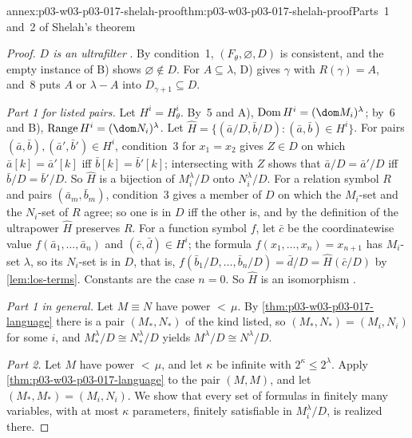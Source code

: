 \begin{annexitem}{annex:p03-w03-p03-017-shelah-proof}{thm:p03-w03-p03-017-shelah-proof}{Parts~1 and~2 of Shelah's theorem}
\begin{proof}
\emph{\(D\) is an ultrafilter} \cite[p.~231]{Shelah1971Ultrapowers}.  By
condition~1, \((F_\theta,\varnothing,D)\) is consistent, and the empty
instance of B) shows \(\varnothing\notin D\).  For \(A\subseteq\lambda\),
D) gives \(\gamma\) with \(R(\gamma)=A\), and~8 puts \(A\) or \(\lambda-A\)
into \(D_{\gamma+1}\subseteq D\).

\emph{Part 1 for listed pairs.}  Let \(H^i=H^i_\theta\).  By~5 and A),
\(\mathrm{Dom}\,H^i=(\dom M_i)^\lambda\); by~6 and B),
\(\mathrm{Range}\,H^i=(\dom N_i)^\lambda\).  Let
\(\hat H=\{(\bar a/D,\bar b/D):(\bar a,\bar b)\in H^i\}\).  For pairs
\((\bar a,\bar b),(\bar a',\bar b')\in H^i\), condition~3 for \(x_1=x_2\)
gives \(Z\in D\) on which \(\bar a[k]=\bar a'[k]\) iff \(\bar b[k]=\bar
b'[k]\); intersecting with \(Z\) shows that \(\bar a/D=\bar a'/D\) iff \(\bar
b/D=\bar b'/D\).  So \(\hat H\) is a bijection of \(M_i^\lambda/D\) onto
\(N_i^\lambda/D\).  For a relation symbol \(R\) and pairs
\((\bar a_m,\bar b_m)\), condition~3 gives a member of \(D\) on which the
\(M_i\)-set and the \(N_i\)-set of \(R\) agree; so one is in \(D\) iff the
other is, and by the definition of the ultrapower \(\hat H\) preserves
\(R\).  For a function symbol \(f\), let \(\bar c\) be the coordinatewise
value \(f(\bar a_1,\ldots,\bar a_n)\) and \((\bar c,\bar d)\in H^i\); the
formula \(f(x_1,\ldots,x_n)=x_{n+1}\) has \(M_i\)-set \(\lambda\), so its
\(N_i\)-set is in \(D\), that is,
\(f(\bar b_1/D,\ldots,\bar b_n/D)=\bar d/D=\hat H(\bar c/D)\) by
\cref{lem:los-terms}.  Constants are the case \(n=0\).  So \(\hat H\) is an
isomorphism \cite[p.~231]{Shelah1971Ultrapowers}.

\emph{Part 1 in general.}  Let \(M\equiv N\) have power \({<}\,\mu\).  By
\cref{thm:p03-w03-p03-017-language} there is a pair \((M_*,N_*)\) of the kind
listed, so \((M_*,N_*)=(M_i,N_i)\) for some \(i\), and
\(M_*^\lambda/D\cong N_*^\lambda/D\) yields \(M^\lambda/D\cong N^\lambda/D\).

\emph{Part 2.}  Let \(M\) have power \({<}\,\mu\), and let \(\kappa\) be
infinite with \(2^\kappa\le2^\lambda\).  Apply
\cref{thm:p03-w03-p03-017-language} to the pair \((M,M)\), and let
\((M_*,M_*)=(M_i,N_i)\).  We show that every set of formulas in finitely
many variables, with at most \(\kappa\) parameters, finitely satisfiable in
\(M_i^\lambda/D\), is realized there.


\end{proof}
\end{annexitem}

